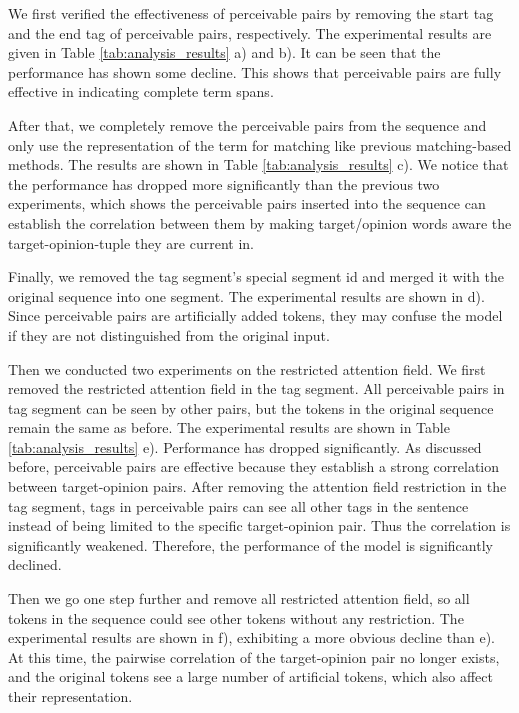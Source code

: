 \documentclass[11pt]{article}
\begin{document}
We first verified the effectiveness of perceivable pairs by removing the start tag and the end tag of perceivable pairs, respectively. The experimental results are given in Table \ref{tab:analysis_results} a) and b). It can be seen that the performance has shown some decline. This shows that perceivable pairs are fully effective in indicating complete term spans. 

After that, we completely remove the perceivable pairs from the sequence and only use the representation of the term for matching like previous matching-based methods. The results are shown in Table \ref{tab:analysis_results} c). We notice that the performance has dropped more significantly than the previous two experiments, which shows the perceivable pairs inserted into the sequence can establish the correlation between them by making target/opinion words aware the target-opinion-tuple they are current in.

Finally, we removed the tag segment's special segment id and merged it with the original sequence into one segment. The experimental results are shown in d). Since perceivable pairs are artificially added tokens, they may confuse the model if they are not distinguished from the original input.

Then we conducted two experiments on the restricted attention field. We first removed the restricted attention field in the tag segment. All perceivable pairs in tag segment can be seen by other pairs, but the tokens in the original sequence remain the same as before.
The experimental results are shown in Table \ref{tab:analysis_results} e). Performance has dropped significantly. 
As discussed before, perceivable pairs are effective because they establish a strong correlation between target-opinion pairs. After removing the attention field restriction in the tag segment, tags in perceivable pairs can see all other tags in the sentence instead of being limited to the specific target-opinion pair. Thus the correlation is significantly weakened. 
Therefore, the performance of the model is significantly declined.

Then we go one step further and remove all restricted attention field, so all tokens in the sequence could see other tokens without any restriction. The experimental results are shown in f), exhibiting a more obvious decline than e). 
At this time, the pairwise correlation of the target-opinion pair no longer exists, and the original tokens see a large number of artificial tokens, which also affect their representation.
\end{document}
